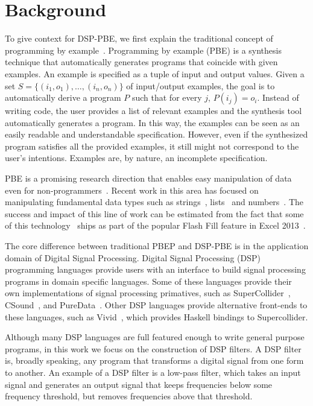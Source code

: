 \section{Background}

To give context for DSP-PBE, we first explain the traditional concept of programming by example~\cite{cypher93,lieberman01,synasc12}.
Programming by example (PBE) is a synthesis technique that automatically generates programs that coincide with given examples. An example is specified as a tuple of input and output values. Given a set $S= \{(i_1, o_1),\ldots, (i_n, o_n)\}$ of input/output examples, the goal is to automatically derive a program $P$ such that for every $j$, $P(i_j) = o_i$. 
Instead of writing code, the user provides a list of relevant examples and the synthesis tool automatically generates a program. In this way, the examples can be seen as an easily readable and understandable specification. However, even if the synthesized program satisfies all the provided examples, it still might not correspond to the user's intentions. Examples are, by nature, an incomplete specification.

PBE is a promising research direction that enables easy manipulation of data even for non-programmers~\cite{GulwaniHS12}. Recent work in this area has focused on manipulating fundamental data types such as strings~\cite{vldb12,icml13}, lists~\cite{FeserCD15,poseraZ15} and numbers~\cite{cav12}. The success and impact of this line of work can be estimated from the fact that some of this technology~\cite{flashFillPOPL} ships as part of the popular Flash Fill feature in Excel 2013~\cite{flashfill}.


The core difference between traditional PBEP and DSP-PBE is in the application domain of Digital Signal Processing.
Digital Signal Processing (DSP) programming languages provide users with an interface to build signal processing programs in domain specific languages.
Some of these languages provide their own implementations of signal processing primatives, such as SuperCollider~\cite{supercollider}, CSound~\cite{csound}, and PureData~\cite{puredata}.
Other DSP languages provide alternative front-ends to these languages, such as Vivid~\cite{vivid}, which provides Haskell bindings to Supercollider.

Although many DSP languages are full featured enough to write general purpose programs, in this work we focus on the construction of DSP filters.
A DSP filter is, broadly speaking, any program that transforms a digital signal from one form to another.
An example of a DSP filter is a low-pass filter, which takes an input signal and generates an output signal that keeps frequencies below some frequency threshold, but removes frequencies above that threshold.


